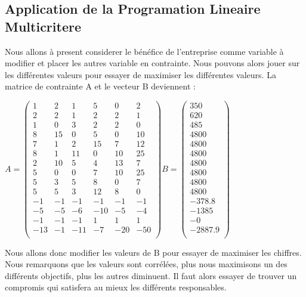 \documentclass[a4paper, 11pt]{article}
\begin{document}
\subsection{Application de la Programation Lineaire Multicritere}
Nous allons à present considerer le bénéfice de l’entreprise comme variable à modifier et placer les autres variable en contrainte. Nous pouvons alors jouer sur les différentes valeurs pour essayer de maximiser les différentes valeurs.
La matrice de contrainte A et le vecteur B deviennent : 

$ A = \begin{pmatrix}
1 &2 &1 &5 &0 &2\\
2 &2 &1 &2 &2 &1\\
1 &0 &3 &2 &2 &0\\
8 &15 &0 &5 &0 &10\\
7 &1 &2 &15 &7 &12\\
8 &1 &11 &0 &10 &25\\
2 &10 &5 &4 &13 &7\\
5 &0 &0 &7 &10 &25\\
5 &3 &5 &8 &0 &7\\
5 &5 &3 &12 &8 &0\\
-1 &-1 &-1 &-1 &-1 &-1\\      %
-5 &-5 &-6 &-10 &-5 &-4\\     %
-1 &-1 &-1 &1 &1 &1\\         %
-13 &-1 &-11 &-7 &-20 &-50\\  %
 \end{pmatrix}  B = \begin{pmatrix}
350\\
620\\
485\\
4800\\
4800\\
4800\\
4800\\
4800\\
4800\\
4800\\
-378.8\\
-1385\\
-0\\
-2887.9 \\
 \end{pmatrix} $
 
Nous allons donc modifier les valeurs de B pour essayer de maximiser les chiffres.
Nous remarquons que les valeurs sont corrélées, plus nous maximisons un des différents objectifs, plus les autres diminuent. Il faut alors essayer de trouver un compromis qui satisfera au mieux les différents responsables.
\end{document}

